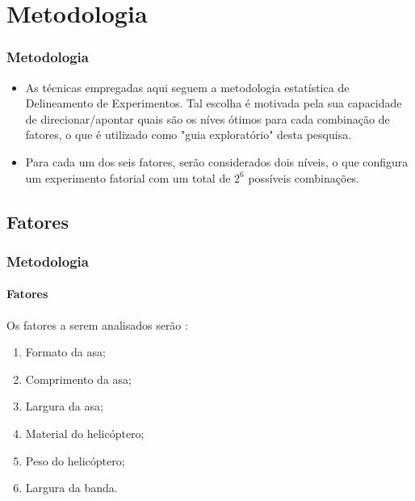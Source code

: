 \documentclass{beamer}
\begin{document}
\section{Metodologia}
    \begin{frame}
        \frametitle{Metodologia}

        \begin{itemize}
            \item As técnicas empregadas aqui seguem a metodologia estatística de Delineamento de Experimentos. Tal escolha é motivada pela sua capacidade de direcionar/apontar quais são os níves ótimos para cada combinação de fatores, o que é utilizado como "guia exploratório" desta pesquisa.

            \item Para cada um dos seis fatores, serão considerados dois níveis, o que configura um experimento fatorial com um total de $2^6$ possíveis combinações.

        \end{itemize}
    \end{frame}

    \subsection{Fatores}
        \begin{frame}
            \frametitle{Metodologia}
                \framesubtitle{Fatores}
                    Os fatores a serem analisados serão :

                        \begin{enumerate}
                            \item Formato da asa;
                            \item Comprimento da asa;
                            \item Largura da asa;
                            \item Material do helicóptero;
                            \item Peso do helicóptero;
                            \item Largura da banda.
                        \end{enumerate}

        \end{frame}
\end{document}
